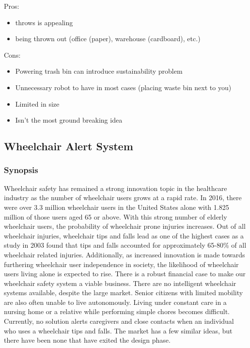 \documentclass[11pt]{article}
\begin{document}
Pros:
\begin{itemize}
\item throws is appealing
\item being thrown out (office (paper), warehouse (cardboard), etc.)
\end{itemize}

Cons:
\begin{itemize}
\item Powering trash bin can introduce sustainability problem
\item Unnecessary robot to have in most cases (placing waste bin next to you)
\item Limited in size
\item Isn’t the most ground breaking idea
\end{itemize}









\subsection{Wheelchair Alert System}
\label{sec:orgb798d46}

\subsubsection{Synopsis}
\label{sec:org3a033d8}
Wheelchair safety has remained a strong innovation topic in the healthcare industry as the number of wheelchair users grows at a rapid rate. In 2016, there were over 3.3 million wheelchair users in the United States alone with 1.825 million of those users aged 65 or above. With this strong number of elderly wheelchair users, the probability of wheelchair prone injuries increases. Out of all wheelchair injuries, wheelchair tips and falls lead as one of the highest cases as a study in 2003 found that tips and falls accounted for approximately 65-80\% of all wheelchair related injuries. Additionally, as increased innovation is made towards furthering wheelchair user independence in society, the likelihood of wheelchair users living alone is expected to rise. There is a robust financial case to make our wheelchair safety system a viable business. There are no intelligent wheelchair systems available, despite the large market. Senior citizens with limited mobility are also often unable to live autonomously. Living under constant care in a nursing home or a relative while performing simple chores becomes difficult. Currently, no solution alerts caregivers and close contacts when an individual who uses a wheelchair tips and falls. The market has a few similar ideas, but there have been none that have exited the design phase.
\end{document}
